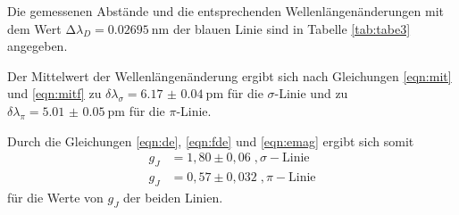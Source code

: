 Die gemessenen Abstände und die entsprechenden Wellenlängenänderungen mit dem Wert
$\increment \lambda_D = \SI{0.02695}{\nano\meter}$ der blauen Linie sind in Tabelle
\ref{tab:tabe3} angegeben.

Der Mittelwert der Wellenlängenänderung ergibt sich nach Gleichungen \ref{eqn:mit} und
\ref{eqn:mitf} zu $ \delta \lambda_{\sigma} = \SI{6.17(4)}{\pico\meter} $ für die $\sigma$-Linie
und zu $ \delta \lambda_{\pi} = \SI{5.01(5)}{\pico\meter} $ für die $\pi$-Linie.

Durch die Gleichungen \ref{eqn:de}, \ref{eqn:fde} und \ref{eqn:emag} ergibt sich somit
\begin{align}
  g_J&=1,80 \pm 0,06 \; , \sigma-\text{Linie}\\
  g_J&=0,57 \pm 0,032 \; , \pi-\text{Linie}
\end{align}
für die Werte von $g_J$ der beiden Linien.
